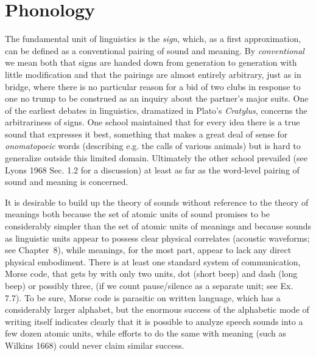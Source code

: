 \chapter{Phonology}

The fundamental unit of linguistics is the {\it sign}, which, as a first
approximation, can be defined as a conventional pairing of sound and meaning.
By {\it conventional} we mean both that signs are handed down from generation
to generation with little modification and that the pairings are almost
entirely arbitrary, just as in bridge, where there is no particular reason for
a bid of two clubs in response to one no trump to be construed as an inquiry
about the partner's major
suits. One of the
earliest debates in linguistics, dramatized in Plato's {\it Cratylus},
concerns the arbitrariness of signs.  One school maintained that for every
idea there is a true sound that expresses it best, something that makes a
great deal of sense for {\it onomatopoeic} words (describing e.g. the calls of
various animals) but is hard to generalize outside this limited domain.
Ultimately the other school prevailed (see Lyons 1968 Sec. 1.2 for a
discussion) \nocite{Lyons:1968} at least as far as the word-level pairing of
sound and meaning is concerned. 

It is desirable to build up the theory of sounds without reference to the
theory of meanings both because the set of atomic units of sound promises to
be considerably simpler than the set of atomic units of meanings and because
sounds as linguistic units appear to possess clear physical correlates
(acoustic waveforms; see Chapter~8), while meanings, for the most part, appear
to lack any direct physical embodiment. There is
at least one standard system of communication, Morse code, that gets by with
only two units, dot (short beep) and dash (long beep) or possibly three, (if we
count pause/silence as a separate unit; see Ex. 7.7). To be sure, Morse
code is parasitic on written language, which has a considerably larger
alphabet, but the enormous success of the alphabetic mode of writing itself
indicates clearly that it is possible to analyze speech sounds into a few
dozen atomic units, while efforts to do the same with meaning (such as Wilkins
1668) \nocite{Wilkins:1668} could never claim similar success.

